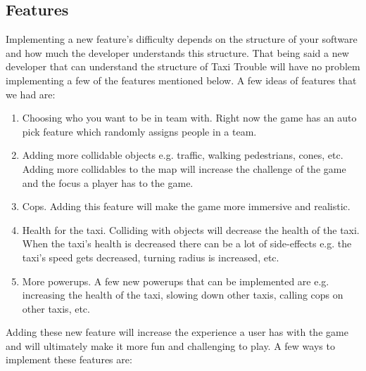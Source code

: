 \subsection*{Features}
Implementing a new feature's difficulty depends on the structure of your software and how much the developer understands this structure. That being said a new developer that can understand the structure of Taxi Trouble will have no problem implementing a few of the features mentioned below. A few ideas of features that we had are:
\begin{enumerate}
\item Choosing who you want to be in team with. Right now the game has an auto pick feature which randomly assigns people in a team.
\item Adding more collidable objects e.g. traffic, walking pedestrians, cones, etc. Adding more collidables to the map will increase the challenge of the game and the focus a player has to the game.
\item Cops. Adding this feature will make the game more immersive and realistic.
\item Health for the taxi. Colliding with objects will decrease the health of the taxi. When the taxi's health is decreased there can be a lot of side-effects e.g. the taxi's speed gets decreased, turning radius is increased, etc.
\item More powerups. A few new powerups that can be implemented are e.g. increasing the health of the taxi, slowing down other taxis, calling cops on other taxis, etc.
\end{enumerate}
Adding these new feature will increase the experience a user has with the game and will ultimately make it more fun and challenging to play. A few ways to implement these features are:
